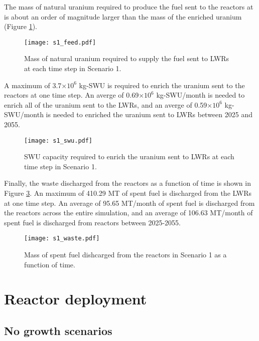 The mass of natural uranium required to produce the fuel sent to the reactors at 
is about an order of magnitude larger than the mass of the enriched uranium 
(Figure \ref{fig:feed1}). 

\begin{figure}
    \centering
    \texttt{[image: s1\_feed.pdf]}
    \caption{Mass of natural uranium required to supply the fuel sent to LWRs at each time step in Scenario 1.}
    \label{fig:feed1}
\end{figure}

A maximum of 3.7$\times 10^6$ kg-SWU is required to 
enrich the uranium sent to the reactors at one time step. An averge of 
0.69$\times 10^6$ kg-SWU/month is needed to enrich all of the uranium sent to 
the \glspl{LWR}, and an averge of 0.59$\times 10^6$ kg-SWU/month is needed to 
enriched the uranium sent to \glspl{LWR} between 2025 and 2055.


\begin{figure}
    \centering
    \texttt{[image: s1\_swu.pdf]}
    \caption{SWU capacity required to enrich the uranium sent to LWRs at each time step in Scenario 1.}
    \label{fig:swu1}
\end{figure}

Finally, the waste discharged from the reactors as a function of time is shown 
in Figure \ref{fig:waste1}. An maximum of 410.29 MT of spent fuel is discharged 
from the \glspl{LWR} at one time step. An average of 95.65 MT/month of spent fuel is 
discharged from the reactors across the entire simulation, and an average of 
106.63 MT/month of spent fuel is discharged from reactors between 2025-2055. 

\begin{figure}
    \centering
    \texttt{[image: s1\_waste.pdf]}
    \caption{Mass of spent fuel dishcarged from the reactors in Scenario 1 as a function of time.}
    \label{fig:waste1}
\end{figure}

\section{Reactor deployment}
\subsection{No growth scenarios}

